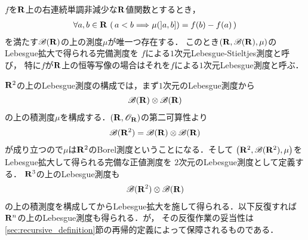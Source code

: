 	\begin{screen}
		\begin{dfn}
			$f$を$\mathbf{R}$上の右連続単調非減少な$\mathbf{R}$値関数とするとき，
			\begin{align}
				\forall a,b \in \mathbf{R}\, \left(\, a < b \Longrightarrow \mu(]a,b]) = f(b) - f(a)\, \right)
			\end{align}
			を満たす$\mathscr{B}(\mathbf{R})$の上の測度$\mu$が唯一つ存在する．
			このとき$(\mathbf{R},\mathscr{B}(\mathbf{R}),\mu)$のLebesgue拡大で得られる完備測度を
			$f$による$1$次元Lebesgue-Stieltjes測度と呼び，
			特に$f$が$\mathbf{R}$上の恒等写像の場合はそれを$f$による$1$次元Lebesgue測度と呼ぶ．
		\end{dfn}
	\end{screen}
	
	$\mathbf{R}^2$の上のLebesgue測度の構成では，まず$1$次元のLebesgue測度から
	\begin{align}
		\mathscr{B}(\mathbf{R}) \otimes \mathscr{B}(\mathbf{R})
	\end{align}
	の上の積測度$\mu$を構成する．$(\mathbf{R},\mathscr{O}_{\mathbf{R}})$の第二可算性より
	\begin{align}
		\mathscr{B}(\mathbf{R}^2) = \mathscr{B}(\mathbf{R}) \otimes \mathscr{B}(\mathbf{R})
	\end{align}
	が成り立つので$\mu$は$\mathbf{R}^2$のBorel測度ということになる．そして
	$\left(\mathbf{R}^2,\mathscr{B}(\mathbf{R}^2),\mu\right)$をLebesgue拡大して得られる完備な正値測度を
	$2$次元のLebesgue測度として定義する．
	$\mathbf{R}^3$の上のLebesgue測度も
	\begin{align}
		\mathscr{B}(\mathbf{R}^2) \otimes \mathscr{B}(\mathbf{R})
	\end{align}
	の上の積測度を構成してからLebesgue拡大を施して得られる．以下反復すれば$\mathbf{R}^n$の上のLebesgue測度も得られる．が，
	その反復作業の妥当性は\ref{sec:recursive_definition}節の再帰的定義によって保障されるものである．
	
